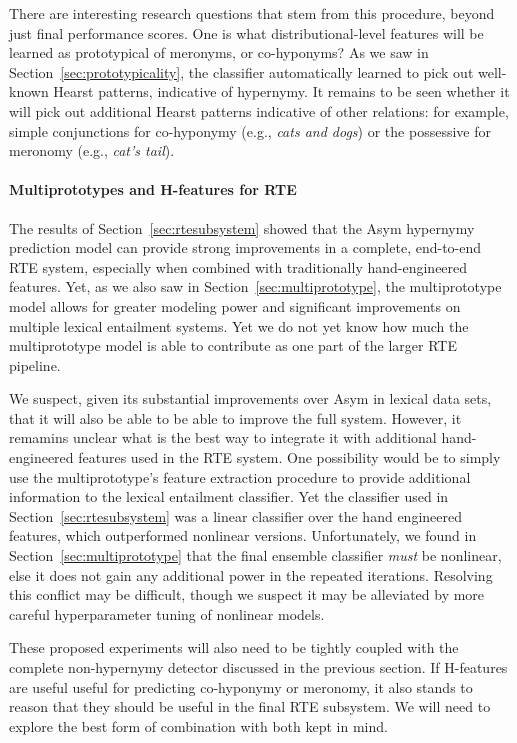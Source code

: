 \documentclass[letterpaper]{article}
\begin{document}
There are interesting research questions that stem from this procedure, beyond
just final performance scores. One is what distributional-level features will
be learned as prototypical of meronyms, or co-hyponyms? As we saw in
Section~\ref{sec:prototypicality}, the classifier automatically learned to pick
out well-known Hearst patterns, indicative of hypernymy. It remains to be seen
whether it will pick out additional Hearst patterns indicative of other
relations: for example, simple conjunctions for co-hyponymy (e.g., {\em cats
and dogs}) or the possessive for meronomy (e.g., {\em cat's tail}).

\paragraph{Multiprototypes and H-features for RTE}

The results of Section~\ref{sec:rtesubsystem} showed that the Asym hypernymy
prediction model can provide strong improvements in a complete, end-to-end RTE
system, especially when combined with traditionally hand-engineered features.
Yet, as we also saw in Section~\ref{sec:multiprototype}, the multiprototype
model allows for greater modeling power and significant improvements on multiple
lexical entailment systems. Yet we do not yet know how much the multiprototype
model is able to contribute as one part of the larger RTE pipeline.

We suspect, given its substantial improvements over Asym in lexical data sets,
that it will also be able to be able to improve the full system. However, it
remamins unclear what is the best way to integrate it with additional
hand-engineered features used in the RTE system.  One possibility would be to
simply use the multiprototype's feature extraction procedure to provide
additional information to the lexical entailment classifier. Yet the classifier
used in Section~\ref{sec:rtesubsystem} was a linear classifier over the hand
engineered features, which outperformed nonlinear versions. Unfortunately, we
found in Section~\ref{sec:multiprototype} that the final ensemble classifier
{\em must} be nonlinear, else it does not gain any additional power in the
repeated iterations. Resolving this conflict may be difficult, though we
suspect it may be alleviated by more careful hyperparameter tuning of nonlinear
models.

These proposed experiments will also need to be tightly coupled with the
complete non-hypernymy detector discussed in the previous section. If H-features
are useful useful for predicting co-hyponymy or meronomy, it also stands to
reason that they should be useful in the final RTE subsystem. We will need to
explore the best form of combination with both kept in mind.
\end{document}
